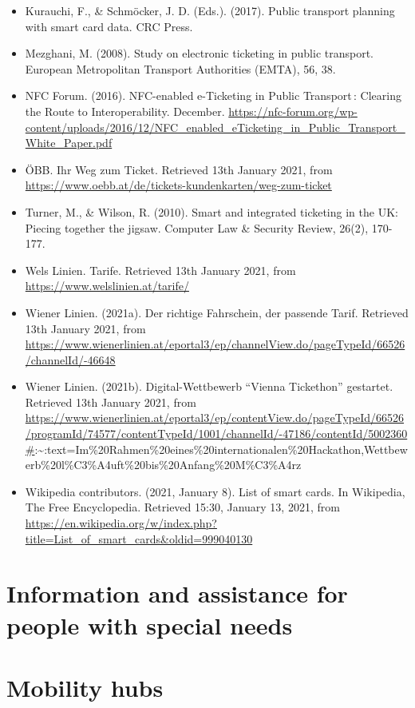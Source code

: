 \documentclass[
]{book}
\providecommand{\tightlist}{%
  \setlength{\itemsep}{0pt}\setlength{\parskip}{0pt}}
\begin{document}
\begin{itemize}
\tightlist
\item
  Kurauchi, F., \& Schmöcker, J. D. (Eds.). (2017). Public transport planning with smart card data. CRC Press.
\item
  Mezghani, M. (2008). Study on electronic ticketing in public transport. European Metropolitan Transport Authorities (EMTA), 56, 38.
\item
  NFC Forum. (2016). NFC-enabled e-Ticketing in Public Transport\,: Clearing the Route to Interoperability. December. \url{https://nfc-forum.org/wp-content/uploads/2016/12/NFC_enabled_eTicketing_in_Public_Transport_White_Paper.pdf}
\item
  ÖBB. Ihr Weg zum Ticket. Retrieved 13th January 2021, from \url{https://www.oebb.at/de/tickets-kundenkarten/weg-zum-ticket}
\item
  Turner, M., \& Wilson, R. (2010). Smart and integrated ticketing in the UK: Piecing together the jigsaw. Computer Law \& Security Review, 26(2), 170-177.
\item
  Wels Linien. Tarife. Retrieved 13th January 2021, from \url{https://www.welslinien.at/tarife/}
\item
  Wiener Linien. (2021a). Der richtige Fahrschein,
  der passende Tarif. Retrieved 13th January 2021, from \url{https://www.wienerlinien.at/eportal3/ep/channelView.do/pageTypeId/66526/channelId/-46648}
\item
  Wiener Linien. (2021b). Digital-Wettbewerb ``Vienna Tickethon'' gestartet. Retrieved 13th January 2021, from \url{https://www.wienerlinien.at/eportal3/ep/contentView.do/pageTypeId/66526/programId/74577/contentTypeId/1001/channelId/-47186/contentId/5002360\#}:\textasciitilde:text=Im\%20Rahmen\%20eines\%20internationalen\%20Hackathon,Wettbewerb\%20l\%C3\%A4uft\%20bis\%20Anfang\%20M\%C3\%A4rz
\item
  Wikipedia contributors. (2021, January 8). List of smart cards. In Wikipedia, The Free Encyclopedia. Retrieved 15:30, January 13, 2021, from \url{https://en.wikipedia.org/w/index.php?title=List_of_smart_cards\&oldid=999040130}
\end{itemize}

\hypertarget{special_needs}{%
\section{Information and assistance for people with special needs}\label{special_needs}}

\hypertarget{mobility_hubs}{%
\section{Mobility hubs}\label{mobility_hubs}}
\end{document}
